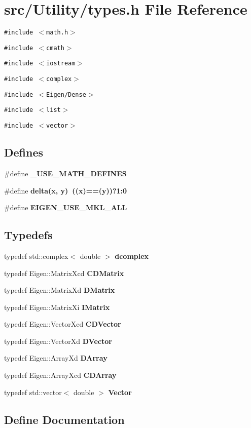 \section{src/Utility/types.h File Reference}
\label{types_8h}
{\tt \#include $<$math.h$>$}\par
{\tt \#include $<$cmath$>$}\par
{\tt \#include $<$iostream$>$}\par
{\tt \#include $<$complex$>$}\par
{\tt \#include $<$Eigen/Dense$>$}\par
{\tt \#include $<$list$>$}\par
{\tt \#include $<$vector$>$}\par
\subsection*{Defines}
\begin{CompactItemize}
\item 
\#define \bf{\_\-USE\_\-MATH\_\-DEFINES}
\item 
\#define \bf{delta}(x, y)~((x)==(y))?1:0
\item 
\#define \bf{EIGEN\_\-USE\_\-MKL\_\-ALL}
\end{CompactItemize}
\subsection*{Typedefs}
\begin{CompactItemize}
\item 
typedef std::complex$<$ double $>$ \bf{dcomplex}
\item 
typedef Eigen::Matrix\-Xcd \bf{CDMatrix}
\item 
typedef Eigen::Matrix\-Xd \bf{DMatrix}
\item 
typedef Eigen::Matrix\-Xi \bf{IMatrix}
\item 
typedef Eigen::Vector\-Xcd \bf{CDVector}
\item 
typedef Eigen::Vector\-Xd \bf{DVector}
\item 
typedef Eigen::Array\-Xd \bf{DArray}
\item 
typedef Eigen::Array\-Xcd \bf{CDArray}
\item 
typedef std::vector$<$ double $>$ \bf{Vector}
\end{CompactItemize}


\subsection{Define Documentation}
